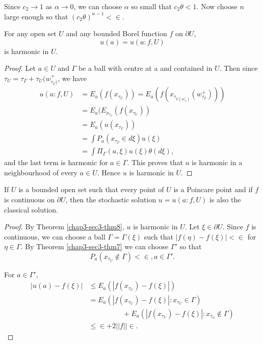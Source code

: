 Since $c_2 \to 1 $ as $\alpha \to 0$, we can choose $\alpha$ so small
that $c_2 \theta < 1$. Now choose $n$ large enough so that $(c_2
\theta)^{n-1} < \in $. 

\begin{thm}\label{chap3-sec3-thm8}%
  For any open set $U$ and any bounded Borel function $f$ on $\partial U$,
  $$
  u(a) = u(a : f, U)
  $$
  is harmonic in $U$.
\end{thm} 

\begin{proof}
  Let $a \in U $ and $\Gamma$ be a ball with centre at a and contained
  in $U$. Then since $\tau_U = \tau_\Gamma + \tau_U
  (w^+_{\tau_\Gamma)}$, we have 
  \begin{align*}
    u(a : f, U) & = E_a (f(x_{\tau_U}))= E_a
    (f(x_{\tau_{U(w^+_{\tau_\Gamma})}} (w^+_{\tau_\Gamma}))) \\ 
    & = E_a (E_{x_{\tau_\Gamma}}(f (x_{\tau_U})) \\
    & = E_a (u(x_{\tau_\Gamma})) \\
    & = \int P_a (x_{\tau_\Gamma} \in d \xi ) u(\xi)\\
    & = \int \Pi_\Gamma (a, \xi)u(\xi) \theta (d \xi),
  \end{align*}\pageoriginale
  and the last term is harmonic for $a \in \Gamma$. This proves that
  $u$ is harmonic in a neighbourhood of every $a \in U$. Hence $u$ is
  harmonic in $U$. 
\end{proof} 

\begin{thm}\label{chap3-sec3-thm9}%
  If $U$ is a bounded open set such that every point of $U$ is a
  Poincare point and if $f$ is continuous on $\partial U$, then the
  stochastic solution $u=u(a:f, U)$ is also the classical solution. 
\end{thm} 

\begin{proof}
  By Theorem \ref{chap3-sec3-thm8}, $u$ is harmonic in $U$. Let $\xi
  \in \partial 
  U$. Since $f$ is continuous, we can choose a ball $\Gamma =
  \Gamma(\xi)$ such that $| f(\eta) - f(\xi)|< \in $ for $\eta \in
  \Gamma$. By Theorem \ref{chap3-sec3-thm7} we can choose $\Gamma'$ so that 
  $$
  P_a (x_{\tau_U} \notin \Gamma) < \in, a \in \Gamma'.
  $$

 
For $a \in \Gamma'$,
\begin{align*}
  |u(a) -f(\xi)| & \leq E_a (|f(x_{\tau_U})-f(\xi)|) \\
  & = E_a(|f(x_{\tau_U})-f(\xi)|:x_{\tau_U} \in \Gamma)\\
  & \hspace{2cm}+E_a
  (|f(x_{\tau_U}) - f(\xi)|:x_{\tau_u} \notin \Gamma)\\ 
  & \leq \in + 2 || f || \in .
\end{align*}
\end{proof}

